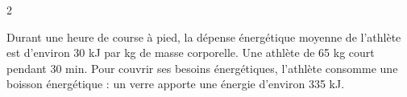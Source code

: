 \documentclass[11pt,a5paper,landscape]{article}
\begin{document}
\begin{multicols*}{2}

Durant une heure de course à pied, la dépense énergétique moyenne de l’athlète est d’environ 30 kJ par kg de masse corporelle.
Une athlète de 65 kg court pendant 30 min. Pour couvrir ses besoins énergétiques, l’athlète consomme une boisson énergétique : un verre apporte une énergie d’environ 335 kJ.


\end{multicols*}
\end{document}
